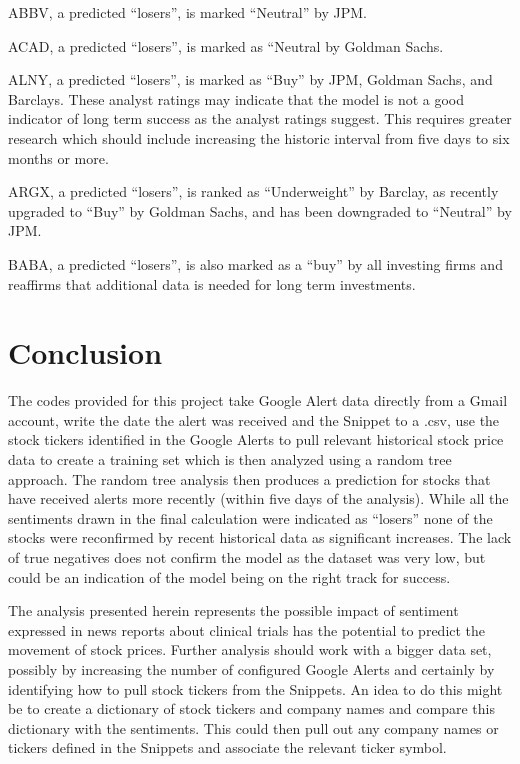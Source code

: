 \documentclass[sigconf]{acmart}
\begin{document}
ABBV, a predicted ``losers'', is marked ``Neutral'' by JPM. 

ACAD, a predicted ``losers'', is marked as ``Neutral by Goldman Sachs.

ALNY, a predicted ``losers'', is marked as ``Buy'' by JPM, Goldman Sachs, and Barclays. These analyst ratings may indicate that the model is not a good indicator of long term success as the analyst ratings suggest. This requires greater research which should include increasing the historic interval from five days to six months or more.

ARGX, a predicted ``losers'', is ranked as ``Underweight'' by Barclay, as recently upgraded to ``Buy'' by Goldman Sachs, and has been downgraded to ``Neutral'' by JPM. 

BABA, a predicted ``losers'', is also marked as a ``buy'' by all investing firms and reaffirms that additional data is needed for long term investments.


\section{Conclusion}
The codes provided for this project take Google Alert data directly from a Gmail account, write the date the alert was received and the Snippet to a .csv, use the stock tickers identified in the Google Alerts to pull relevant historical stock price data to create a training set which is then analyzed using a random tree approach. The random tree analysis then produces a prediction for stocks that have received alerts more recently (within five days of the analysis). While all the sentiments drawn in the final calculation were indicated as ``losers'' none of the stocks were reconfirmed by recent historical data as significant increases. The lack of true negatives does not confirm the model as the dataset was very low, but could be an indication of the model being on the right track for success.

The analysis presented herein represents the possible impact of sentiment expressed in news reports about clinical trials has the potential to predict the movement of stock prices. Further analysis should work with a bigger data set, possibly by increasing the number of configured Google Alerts and certainly by identifying how to pull stock tickers from the Snippets. An idea to do this might be to create a dictionary of stock tickers and company names and compare this dictionary with the sentiments. This could then pull out any company names or tickers defined in the Snippets and associate the relevant ticker symbol. 
\end{document}
